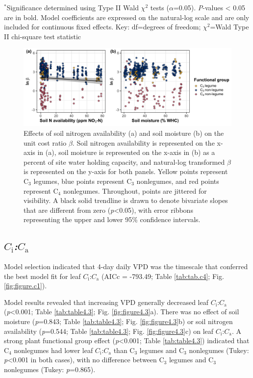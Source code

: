\noindent $^*$Significance determined using Type II Wald $\chi^{2}$ tests ($\alpha$=0.05). \textit{P}-values < 0.05 are in bold. Model coefficients are expressed on the natural-log scale and are only included for continuous fixed effects. Key: df=degrees of freedom; $\chi^2$=Wald Type II chi-square test statistic
\clearpage

\newpage
\begin{landscape}
    \begin{figure}
    \centering
    \includegraphics[scale = 0.075]{ch4_TXeco/figs/TXeco_fig2_beta.png}
    \caption[Effects of soil nitrogen availability and soil moisture on the unit cost ratio $\beta$]{Effects of soil nitrogen availability (a) and soil moisture (b) on the unit cost ratio $\beta$. Soil nitrogen availability is represented on the x-axis in (a), soil moisture is represented on the x-axis in (b) as a percent of site water holding capacity, and natural-log transformed $\beta$ is represented on the y-axis for both panels. Yellow points represent C$_3$ legumes, blue points represent C$_3$ nonlegumes, and red points represent C$_4$ nonlegumes. Throughout, points are jittered for visibility. A black solid trendline is drawn to denote bivariate slopes that are different from zero (\textit{p}<0.05), with error ribbons representing the upper and lower 95\% confidence intervals.}
    \label{fig:figure4.2}
\end{figure}
\end{landscape}
\clearpage

\subsection{\textit{$C_\mathrm{i}$:$C_\mathrm{a}$}}
\noindent Model selection indicated that 4-day daily VPD was the timescale that conferred the best model fit for leaf $C_\mathrm{i}$:$C_\mathrm{a}$ (AICc = -793.49; Table \ref{tab:tab.c4}; Fig. \ref{fig:figure.c1}).

Model results revealed that increasing VPD generally decreased leaf $C_\mathrm{i}$:$C_\mathrm{a}$ (\textit{p}<0.001; Table \ref{tab:table4.3}; Fig. \ref{fig:figure4.3}a). There was no effect of soil moisture (\textit{p}=0.843; Table \ref{tab:table4.3}; Fig. \ref{fig:figure4.3}b) or soil nitrogen availability (\textit{p}=0.544; Table \ref{tab:table4.3}; Fig. \ref{fig:figure4.3}c) on leaf $C_\mathrm{i}$:$C_\mathrm{a}$. A strong plant functional group effect (\textit{p}<0.001; Table \ref{tab:table4.3}) indicated that C$_4$ nonlegumes had lower leaf $C_\mathrm{i}$:$C_\mathrm{a}$ than C$_3$ legumes and C$_3$ nonlegumes (Tukey: \textit{p}<0.001 in both cases), with no difference between C$_3$ legumes and C$_3$ nonlegumes (Tukey: \textit{p}=0.865).

